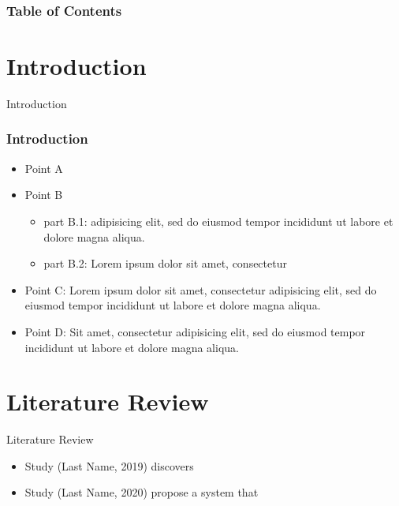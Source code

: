 \documentclass[10pt]{beamer}
\title[University of Wisconsin Milwaukee]{\mytitle}
\author[\myauthor]{\myauthor}
\institute[]{University of Wisconsin Milwaukee}
\date[\textcolor{white}{05/03/2024}]{05/03/2024}
\begin{document}
    \frame{\titlepage}
    \begin{frame}
        \frametitle{Table of Contents}
        \tableofcontents
    \end{frame}



    \section{Introduction}
    \begin{frame}{Introduction}
        \frametitle{Introduction}
        \begin{itemize}
            \item Point A
            \item Point B
            \begin{itemize}
                \item part B.1: adipisicing elit, sed do eiusmod tempor incididunt ut labore et dolore magna aliqua.
                \item part B.2: Lorem ipsum dolor sit amet, consectetur
            \end{itemize}
            \item Point C: Lorem ipsum dolor sit amet, consectetur adipisicing elit, sed do eiusmod tempor incididunt ut labore et dolore magna aliqua.
            \item Point D: Sit amet, consectetur adipisicing elit, sed do eiusmod tempor incididunt ut labore et dolore magna aliqua.
        \end{itemize}
    \end{frame}


    \section{Literature Review}

    \begin{frame}{Literature Review}


        \begin{itemize}
            \item  Study (Last Name, 2019) discovers
            \item  Study (Last Name, 2020) propose a system that
        \end{itemize}
    \end{frame}
\end{document}
